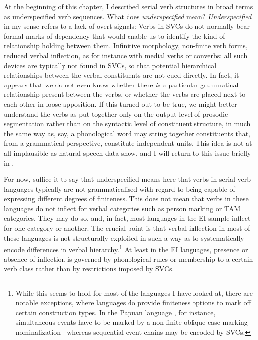 At the beginning of this chapter, I described serial verb structures in broad terms as underspecified verb sequences. What does \textit{underspecified} mean? \textit{Underspecified} in my sense refers to a lack of overt signals: Verbs in SVCs do not normally bear formal marks of dependency that would enable us to identify the kind of relationship holding between them. Infinitive morphology, non-finite verb forms, reduced verbal inflection, as for instance with medial verbs or converbs: all such devices are typically not found in SVCs, so that potential hierarchical relationships between the verbal constituents are not cued directly. In fact, it appears that we do not even know whether there \emph{is} a particular grammatical relationship present between the verbs, or whether the verbs are placed next to each other in loose apposition. If this turned out to be true, we might better understand the verbs as put together only on the output level of prosodic segmentation rather than on the syntactic level of constituent structure, in much the same way as, say, a phonological word may string together constituents that, from a grammatical perspective, constitute independent units. This idea is not at all implausible as natural speech data show, and I will return to this issue briefly in . 

For now, suffice it to say that underspecified means here that verbs in serial verb languages typically are not grammaticalised with regard to being capable of expressing different degrees of finiteness. This does not mean that verbs in these languages do not inflect for verbal categories such as person marking or TAM categories. They may do so, and, in fact, most languages in the EI sample inflect for one category or another. The crucial point is that verbal inflection in most of these languages is not structurally exploited in such a way as to systematically encode differences in verbal hierarchy.\footnote{While this seems to hold for most of the languages I have looked at, there are notable exceptions, where languages do provide finiteness options to mark off certain construction types. In the Papuan language , for instance, simultaneous events have to be marked by a non-finite oblique case-marking nominalization \citep[142]{foley2008}, whereas sequential event chains may be encoded by SVCs.} At least in the EI languages, presence or absence of inflection is governed by phonological rules or membership to a certain verb class rather than by restrictions imposed by SVCs.

